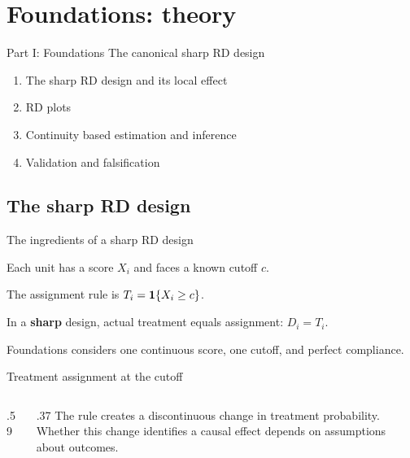 \section{Foundations: theory}
\begin{frame}[plain]{Part I: Foundations}
\vspace{1em}\Large The canonical sharp RD design
\vspace{1.2em}\normalsize
\begin{enumerate}\setlength{\itemsep}{.65em}
\item The sharp RD design and its local effect
\item RD plots
\item Continuity based estimation and inference
\item Validation and falsification
\end{enumerate}
\end{frame}

\subsection{The sharp RD design}
\begin{frame}{The ingredients of a sharp RD design}
\begin{items}
\item Each unit has a score $X_i$ and faces a known cutoff $c$.
\item The assignment rule is $T_i=\mathbf{1}\{X_i\geq c\}$.
\item In a \textbf{sharp} design, actual treatment equals assignment: $D_i=T_i$.
\item Foundations considers one continuous score, one cutoff, and perfect compliance.
\end{items}
\end{frame}

\begin{frame}{Treatment assignment at the cutoff}
\begin{columns}
\begin{column}{.59\textwidth}\end{column}
\begin{column}{.37\textwidth}
The rule creates a discontinuous change in treatment probability.\\[1em]
Whether this change identifies a causal effect depends on assumptions about outcomes.
\end{column}
\end{columns}
\end{frame}


